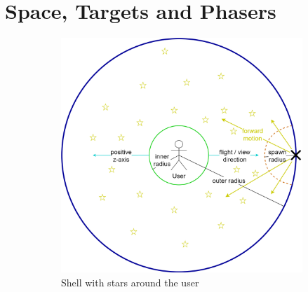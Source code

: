 \documentclass[hyperref, bachelorofscience]{cgvpub}
\begin{document}
\section{Space, Targets and Phasers} \label{sec:space}
\begin{figure}[b!]
	\centering
	\begin{subfigure}{.63\linewidth}
		\includegraphics[width=\linewidth]{../pics/stars_sphere_schema}
		\caption{Shell with stars around the user}
		\label{fig:space:shell}
	\end{subfigure}
	\hfill
	\begin{subfigure}{.34\linewidth}
		\centering

\end{subfigure}
\end{figure}
\end{document}
